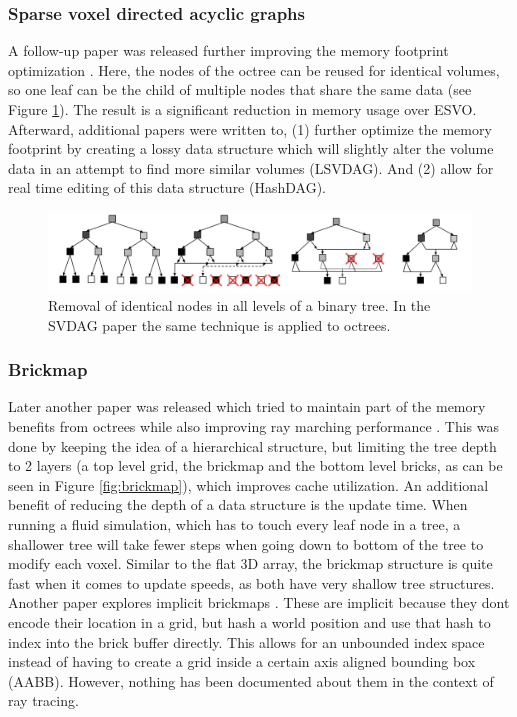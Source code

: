 \subsubsection{Sparse voxel directed acyclic graphs} \label{introduction:voxel_data_structures:svdag}
A follow-up paper was released further improving the memory footprint optimization \cite{kampe2013high}. Here, the nodes of the octree can be reused for identical volumes, so one leaf can be the child of multiple nodes that share the same data (see Figure \ref{fig:DAG_node_deduplication}). The result is a significant reduction in memory usage over ESVO. Afterward, additional papers were written to, (1) further optimize the memory footprint by creating a lossy data structure which will slightly alter the volume data in an attempt to find more similar volumes \cite{van2020lossy} (LSVDAG). And (2) allow for real time editing of this data structure \cite{careil2020interactively} (HashDAG).

\begin{figure}[H]
    \centering
    \includegraphics[width=0.9\linewidth]{figures/DAG_node_deduplication.png}
    \caption{Removal of identical nodes in all levels of a binary tree. In the SVDAG paper the same technique is applied to octrees. \cite{kampe2013high}}
    \label{fig:DAG_node_deduplication}
\end{figure}
\subsubsection{Brickmap} \label{introduction:voxel_data_structures:brickmap}
Later another paper was released which tried to maintain part of the memory benefits from octrees while also improving ray marching performance \cite{van2015real}. This was done by keeping the idea of a hierarchical structure, but limiting the tree depth to 2 layers (a top level grid, the brickmap and the bottom level bricks, as can be seen in Figure \ref{fig:brickmap}), which improves cache utilization. An additional benefit of reducing the depth of a data structure is the update time. When running a fluid simulation, which has to touch every leaf node in a tree, a shallower tree will take fewer steps when going down to bottom of the tree to modify each voxel. Similar to the flat 3D array, the brickmap structure is quite fast when it comes to update speeds, as both have very shallow tree structures. Another paper explores implicit brickmaps \cite{niessner2013real}. These are implicit because they dont encode their location in a grid, but hash a world position and use that hash to index into the brick buffer directly. This allows for an unbounded index space instead of having to create a grid inside a certain axis aligned bounding box (AABB). However, nothing has been documented about them in the context of ray tracing.

